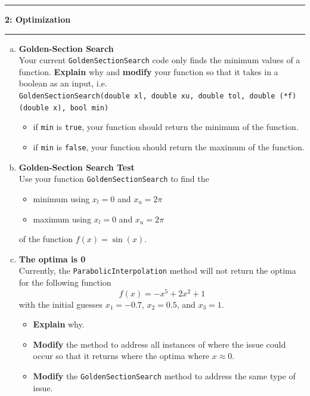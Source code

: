 \documentclass[11pt]{article}
\newcommand\question[2]{\vspace{.25in}\hrule\textbf{#1: #2}\vspace{.5em}\hrule\vspace{.10in}}
\begin{document}
\newpage
\question{2}{Optimization}
\begin{enumerate}[(a)]
	\item \textbf{Golden-Section Search}\\
	Your current \texttt{GoldenSectionSearch} code only finds the minimum values of a function. \textbf{Explain} why and \textbf{modify} your function so that it takes in a boolean as an input, i.e.\\ \texttt{GoldenSectionSearch(double xl, double xu, double tol, double (*f)(double x), bool min)}  
	\begin{itemize}
		\item if \texttt{min} is \texttt{true}, your function should return the minimum of the function.
		\item if \texttt{min} is \texttt{false}, your function should return the maximum of the function.
	\end{itemize}
	
	\item \textbf{Golden-Section Search Test}\\
	Use your function \texttt{GoldenSectionSearch} to find the 
	\begin{itemize}
		\item minimum using $x_l = 0$ and $x_u = 2\pi$
		\item maximum using $x_l = 0$ and $x_u = 2\pi$
	\end{itemize}
	of the function $f(x) = \sin(x)$.

	\item \textbf{The optima is 0}\\
	Currently, the \texttt{ParabolicInterpolation} method will not return the optima for the following function
	 $$f(x) =  -x^5 +2x^2+1$$
	 with the initial guesses $x_1 = -0.7$, $x_2=0.5$, and $x_3= 1$.
	\begin{itemize}
		\item \textbf{Explain} why.
		\item \textbf{Modify} the method to address all instances of where the issue could occur so that it returns where the optima where $x\approx0$.
		\item \textbf{Modify} the \texttt{GoldenSectionSearch} method to address the same type of issue.
	\end{itemize}
	
\end{enumerate}
\end{document}
